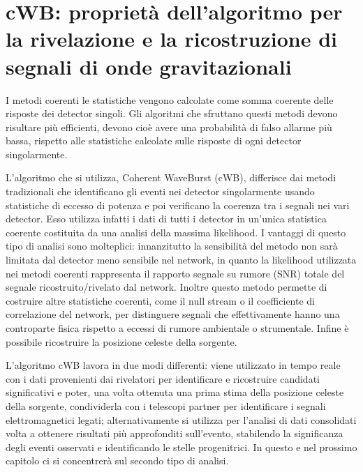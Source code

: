 \chapter[cWB]{cWB: proprietà dell'algoritmo per la rivelazione e la ricostruzione di segnali di onde gravitazionali}
\label{chapter:cwb}
I metodi coerenti le statistiche vengono calcolate come somma coerente delle risposte dei detector singoli. Gli algoritmi che sfruttano questi metodi devono risultare più efficienti, devono cioè avere una probabilità di falso allarme più bassa, rispetto alle statistiche calcolate sulle risposte di ogni detector singolarmente.

L'algoritmo che si utilizza, Coherent WaveBurst (cWB), differisce dai metodi tradizionali che identificano gli eventi nei detector singolarmente usando statistiche di eccesso di potenza e poi verificano la coerenza tra i segnali nei vari detector. Esso utilizza infatti i dati di tutti i detector in un'unica statistica coerente costituita da una analisi della massima likelihood. 
I vantaggi di questo tipo di analisi sono molteplici: innanzitutto la sensibilità del metodo non sarà limitata dal detector meno sensibile nel network, in quanto la likelihood utilizzata nei metodi coerenti rappresenta il rapporto segnale su rumore (SNR) totale del segnale ricostruito/rivelato dal network. Inoltre questo metodo permette di costruire altre statistiche coerenti, come il null stream o il coefficiente di correlazione  del network, per distinguere segnali che effettivamente hanno una controparte fisica rispetto a eccessi di rumore ambientale o strumentale. Infine è possibile ricostruire la posizione celeste della sorgente\cite{Klimenko_2008}.

L'algoritmo cWB lavora in due modi differenti: viene utilizzato in tempo reale con i dati provenienti dai rivelatori per identificare e ricostruire candidati significativi e poter, una volta ottenuta una prima stima della posizione celeste della sorgente, condividerla con i telescopi partner per identificare i segnali elettromagnetici legati; alternativamente si utilizza per l'analisi di dati consolidati volta a ottenere risultati più approfonditi sull'evento, stabilendo la significanza degli eventi osservati e identificando le stelle progenitrici\cite{Klimenko_2016}. In questo e nel prossimo capitolo ci si concentrerà sul secondo tipo di analisi.
